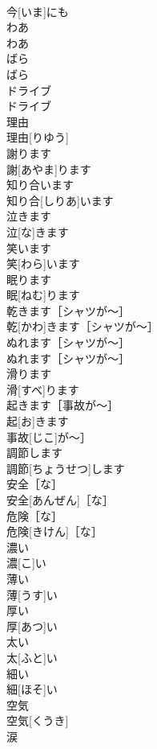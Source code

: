 \documentclass[8pt]{extreport}
\begin{document}
\begin{CJK}{UTF8}{min}
\\	今[いま]にも	
\\	わあ	
\\	わあ	
\\	ばら	
\\	ばら	
\\	ドライブ	
\\	ドライブ	
\\	理由	
\\	理由[りゆう]	
\\	謝ります	
\\	謝[あやま]ります	
\\	知り合います	
\\	知り合[しりあ]います	
\\	泣きます	
\\	泣[な]きます	
\\	笑います	
\\	笑[わら]います	
\\	眠ります	
\\	眠[ねむ]ります	
\\	乾きます［シャツが〜］	
\\	乾[かわ]きます［シャツが〜］	
\\	ぬれます［シャツが〜］	
\\	ぬれます［シャツが〜］	
\\	滑ります	
\\	滑[すべ]ります	
\\	起きます［事故が〜］	
\\	起[お]きます
\\	事故[じこ]が〜］	
\\	調節します	
\\	調節[ちょうせつ]します	
\\	安全［な］	
\\	安全[あんぜん]［な］	
\\	危険［な］	
\\	危険[きけん]［な］	
\\	濃い	
\\	濃[こ]い	
\\	薄い	
\\	薄[うす]い	
\\	厚い	
\\	厚[あつ]い	
\\	太い	
\\	太[ふと]い	
\\	細い	
\\	細[ほそ]い	
\\	空気	
\\	空気[くうき]	
\\	涙	

\end{CJK}
\end{document}
